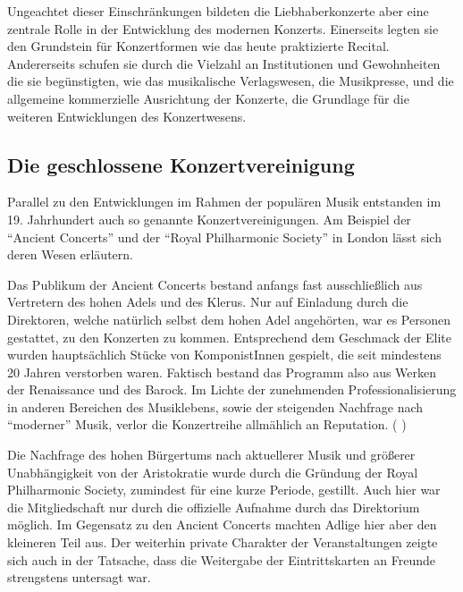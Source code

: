 \documentclass[a4paper, german, oneside]{scrbook}
\begin{document}
Ungeachtet dieser Einschränkungen bildeten die Liebhaberkonzerte aber eine zentrale Rolle in der Entwicklung des modernen Konzerts. Einerseits legten sie den Grundstein für Konzertformen wie das heute praktizierte Recital. Andererseits schufen sie durch die Vielzahl an Institutionen und Gewohnheiten die sie begünstigten, wie das musikalische Verlagswesen, die Musikpresse, und die allgemeine kommerzielle Ausrichtung der Konzerte, die Grundlage für die weiteren Entwicklungen des Konzertwesens.

\subsection{Die geschlossene Konzertvereinigung}
\label{konzertvereinigung}

Parallel zu den Entwicklungen im Rahmen der populären Musik entstanden im 19. Jahrhundert auch so genannte Konzertvereinigungen. Am Beispiel der \enquote{Ancient Concerts} und der \enquote{Royal Philharmonic Society} in London lässt sich deren Wesen erläutern.

Das Publikum der Ancient Concerts bestand anfangs fast ausschließlich aus Vertretern des hohen Adels und des Klerus. Nur auf Einladung durch die Direktoren, welche natürlich selbst dem hohen Adel angehörten, war es Personen gestattet, zu den Konzerten zu kommen. Entsprechend dem Geschmack der Elite wurden hauptsächlich Stücke von KomponistInnen gespielt, die seit mindestens 20 Jahren verstorben waren. Faktisch bestand das Programm also aus Werken der Renaissance und des Barock. Im Lichte der zunehmenden Professionalisierung in anderen Bereichen des Musiklebens, sowie der steigenden Nachfrage nach \enquote{moderner} Musik, verlor die Konzertreihe allmählich an Reputation. (\cite[92ff.;]{muller_publikum_2014} \cite[73]{weber_music_2004})

Die Nachfrage des hohen Bürgertums nach aktuellerer Musik und größerer Unabhängigkeit von der Aristokratie wurde durch die Gründung der Royal Philharmonic Society, zumindest für eine kurze Periode, gestillt. Auch hier war die Mitgliedschaft nur durch die offizielle Aufnahme durch das Direktorium möglich. Im Gegensatz zu den Ancient Concerts machten Adlige hier aber den kleineren Teil aus. Der weiterhin private Charakter der Veranstaltungen zeigte sich auch in der Tatsache, dass die Weitergabe der Eintrittskarten an Freunde strengstens untersagt war. \parencite[vgl.][93]{muller_publikum_2014}
\end{document}
